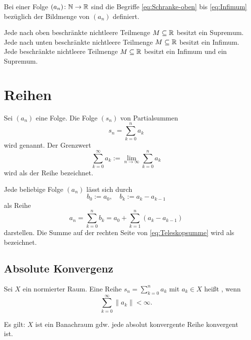 \begin{definition}
Bei einer Folge $(a_n)\colon\mathbb N\to\mathbb R$ sind die
Begriffe \eqref{eq:Schranke-oben}
bis \eqref{eq:Infimum} bezüglich der Bildmenge
von $(a_n)$ definiert.
\end{definition}

\noindent
Jede nach oben beschränkte nichtleere Teilmenge $M\subseteq\mathbb R$
besitzt ein Supremum.
Jede nach unten beschränkte nichtleere Teilmenge $M\subseteq\mathbb R$
besitzt ein Infimum.
Jede beschränkte nichtleere Teilmenge $M\subseteq\mathbb R$
besitzt ein Infimum und ein Supremum.

\newpage
\section{Reihen}
\begin{definition}[Reihe]
Sei $(a_n)$ eine Folge. Die Folge $(s_n)$ von
Partialsummen%
\begin{equation}
s_n = \sum_{k=0}^n a_k
\end{equation}
wird  genannt. Der Grenzwert
\begin{equation}
\sum_{k=0}^\infty a_k := \lim_{n\to\infty}\sum_{k=0}^n a_k
\end{equation}
wird als  der Reihe bezeichnet.
\end{definition}
Jede beliebige Folge $(a_n)$ lässt sich durch
\begin{equation}
b_0:=a_0,\quad b_k:=a_k-a_{k-1}
\end{equation}
als Reihe
\begin{equation}\label{eq:Teleskopsumme}
a_n = \sum_{k=0}^n b_k = a_0+\sum_{k=1}^n (a_k-a_{k-1})
\end{equation}
darstellen. Die Summe auf der rechten Seite von \eqref{eq:Teleskopsumme}
wird als  bezeichnet.

\subsection{Absolute Konvergenz}
\begin{definition}
Sei $X$ ein normierter Raum.
Eine Reihe $s_n=\sum_{k=0}^n a_k$ mit $a_k\in X$
heißt , wenn
\begin{equation}\label{eq:absolut-convergence}\textstyle
\sum_{k=0}^\infty \|a_k\| < \infty.
\end{equation}
\end{definition}
\noindent
Es gilt: $X$ ist ein Banachraum gdw. jede absolut konvergente
Reihe konvergent ist.

